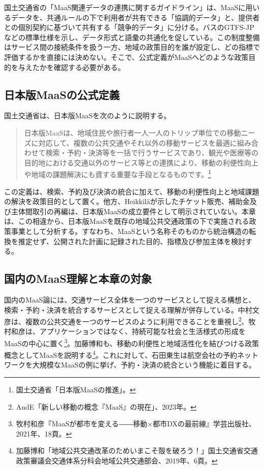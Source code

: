 国土交通省の「MaaS関連データの連携に関するガイドライン」は、MaaSに用いるデータを、共通ルールの下で利用者が共有できる「協調的データ」と、提供者との個別契約に基づいて共有する「競争的データ」に分ける。バスのGTFS-JPなどの標準仕様を示し、データ形式と語彙の共通化を促している。この制度整備はサービス間の接続条件を扱う一方、地域の政策目的を誰が設定し、どの指標で評価するかを直接には決めない。そこで、公式定義がMaaSへどのような政策目的を与えたかを確認する必要がある。

\subsection{日本版MaaSの公式定義}
\label{subsec:ch4_japan_maas_def1}

国土交通省は、日本版MaaSを次のように説明する。

\begin{quote}
日本版MaaSは、地域住民や旅行者一人一人のトリップ単位での移動ニーズに対応して、複数の公共交通やそれ以外の移動サービスを最適に組み合わせて検索・予約・決済等を一括で行うサービスであり、観光や医療等の目的地における交通以外のサービス等との連携により、移動の利便性向上や地域の課題解決にも資する重要な手段となるものです。\footnote{国土交通省「日本版MaaSの推進」。}
\end{quote}

この定義は、検索、予約及び決済の統合に加えて、移動の利便性向上と地域課題の解決を政策目的として置く。他方、Heikkiläが示したチケット販売、補助金及び主体間取引の再編は、日本版MaaSの成立要件として明示されていない。本章は、この相違から、日本版MaaSを既存の地域公共交通政策の下で実施される政策事業として分析する。すなわち、MaaSという名称そのものから統治構造の転換を推定せず、公開された計画に記録された目的、指標及び参加主体を検討する。

\subsection{国内のMaaS理解と本章の対象}
\label{subsec:ch4_japan_maas_def2}

国内のMaaS論には、交通サービス全体を一つのサービスとして捉える構想と、検索・予約・決済を統合するサービスとして捉える理解が併存している。中村文彦は、複数の公共交通を一つのサービスのように利用できることを重視し\footnote{AndE「新しい移動の概念『MaaS』の現在」、2023年。}、牧村和彦は、アプリケーションではなく、持続可能な社会と生活様式の形成をMaaSの中心に置く\footnote{牧村和彦『MaaSが都市を変える――移動×都市DXの最前線』学芸出版社、2021年、18頁。}。加藤博和も、移動の利便性と地域活性化を結びつける政策概念としてMaaSを説明する\footnote{加藤博和「地域公共交通改革のためいまこそ殻を破ろう！」国土交通省交通政策審議会交通体系分科会地域公共交通部会、2019年、6頁。}。これに対して、石田東生は航空会社の予約ネットワークを大規模なMaaSの例に挙げ、予約・決済の統合という機能に着目する\cite{ishida2020}。

